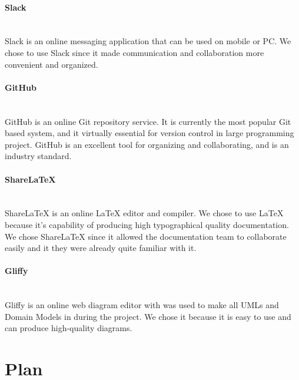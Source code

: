 \documentclass[12pt]{article}
\begin{document}
\paragraph*{Slack}~\\
Slack is an online messaging application that can be used on mobile or PC. We chose to use Slack since it made communication and collaboration more convenient and organized.
%
\paragraph*{GitHub}~\\
GitHub is an online Git repository service. It is currently the most popular Git based system, and it virtually essential for version control in large programming project. GitHub is an excellent tool for organizing and collaborating, and is an industry standard.
%
\paragraph*{ShareLaTeX}~\\
ShareLaTeX is an online LaTeX editor and compiler. We chose to use LaTeX because it's capability of producing high typographical quality documentation. We chose ShareLaTeX since it allowed the documentation team to collaborate easily and it they were already quite familiar with it. 
%
\paragraph*{Gliffy}~\\
Gliffy is an online web diagram editor with was used to make all UMLs and Domain Models in during the project. We chose it because it is easy to use and can produce high-quality diagrams.
%
\vfill
\newpage
\section{Plan}


\vfill
\newpage
\end{document}

